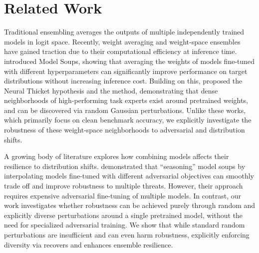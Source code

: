 \section{Related Work}

Traditional ensembling averages the outputs of multiple independently trained models in logit space. Recently, weight averaging and weight-space ensembles have gained traction due to their computational efficiency at inference time. \citet{wortsman2022model} introduced Model Soups, showing that averaging the weights of models fine-tuned with different hyperparameters can significantly improve performance on target distributions without increasing inference cost. Building on this, \citet{gan2026neural} proposed the Neural Thicket hypothesis and the \randopt method, demonstrating that dense neighborhoods of high-performing task experts exist around pretrained weights, and can be discovered via random Gaussian perturbations. Unlike these works, which primarily focus on clean benchmark accuracy, we explicitly investigate the robustness of these weight-space neighborhoods to adversarial and distribution shifts.

A growing body of literature explores how combining models affects their resilience to distribution shifts. \citet{croce2023seasoning} demonstrated that ``seasoning'' model soups by interpolating models fine-tuned with different adversarial objectives can smoothly trade off and improve robustness to multiple threats. However, their approach requires expensive adversarial fine-tuning of multiple models. In contrast, our work investigates whether robustness can be achieved purely through random and explicitly diverse perturbations around a single pretrained model, without the need for specialized adversarial training. We show that while standard random perturbations are insufficient and can even harm \ood robustness, explicitly enforcing diversity via \methodname recovers and enhances ensemble resilience.